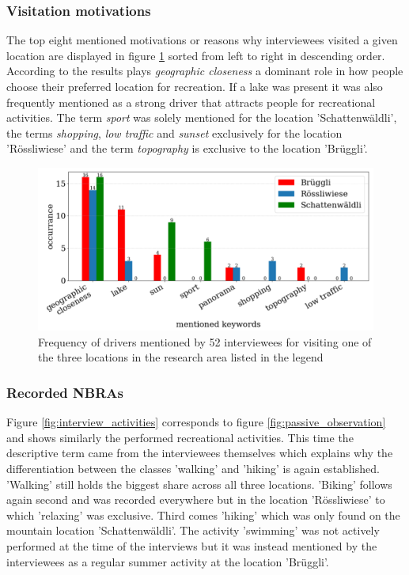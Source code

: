 \subsubsection{Visitation motivations}
The top eight mentioned motivations or reasons why interviewees visited a given location are displayed in figure \ref{fig:interview_visitation_motivation} sorted from left to right in descending order. According to the results plays \textit{geographic closeness} a dominant role in how people choose their preferred location for recreation. If a lake was present it was also frequently mentioned as a strong driver that attracts people for recreational activities. The term \textit{sport} was solely mentioned for the location 'Schattenw\"aldli', the terms \textit{shopping}, \textit{low traffic} and \textit{sunset} exclusively for the location 'R\"ossliwiese' and the term \textit{topography} is exclusive to the location 'Br\"uggli'.

\begin{figure}[!htb]
   \centering
   \includegraphics[width=\textwidth]{img/interview_keywords.pdf}
   \caption{Frequency of drivers mentioned by 52 interviewees for visiting one of the three locations in the research area listed in the legend}
   \label{fig:interview_visitation_motivation}
\end{figure}

\subsubsection{Recorded NBRAs}
Figure \ref{fig:interview_activities} corresponds to figure \ref{fig:passive_observation} and shows similarly the performed recreational activities. This time the descriptive term came from the interviewees themselves which explains why the differentiation between the classes 'walking' and 'hiking' is again established. 'Walking' still holds the biggest share across all three locations. 'Biking' follows again second and was recorded everywhere but in the location 'R\"ossliwiese' to which 'relaxing' was exclusive. Third comes 'hiking' which was only found on the mountain location 'Schattenw\"aldli'. The activity 'swimming' was not actively performed at the time of the interviews but it was instead mentioned by the interviewees as a regular summer activity at the location 'Br\"uggli'.

